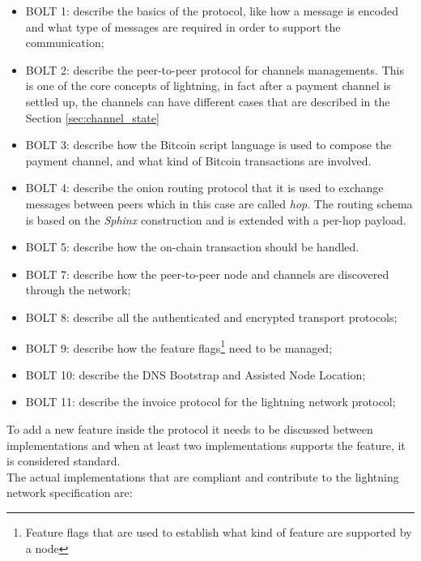 \begin{itemize}
  \item BOLT 1: describe the basics of the protocol, like how a message is encoded and what type of messages are required in order to support the communication;
  \item BOLT 2: describe the peer-to-peer protocol for channels managements. This is one of the core concepts of lightning, in fact after a payment channel
        is settled up, the channels can have different cases that are described in the Section \ref{sec:channel_state}
  \item BOLT 3: describe how the Bitcoin script language is used to compose the
        payment channel, and what kind of Bitcoin transactions are involved.
  \item BOLT 4: describe the onion routing protocol that it is used to exchange messages between peers which in this case are called \emph{hop}.
        The routing schema is based on the \emph{Sphinx}\cite{sphinx} construction and is extended with a per-hop payload.
  \item BOLT 5: describe how the on-chain transaction should be handled.
  \item BOLT 7: describe how the peer-to-peer node and channels are discovered through the network;
  \item BOLT 8: describe all the authenticated and encrypted transport protocols;
  \item BOLT 9: describe how the feature flags\footnote{Feature flags that are used to establish what kind of feature are supported by a node} need to be managed;
  \item BOLT 10: describe the DNS Bootstrap and Assisted Node Location;
  \item BOLT 11: describe the invoice protocol for the lightning network protocol;
\end{itemize}

To add a new feature inside the protocol it needs to be discussed between implementations and when at least two implementations supports the feature, it is considered standard.\\
The actual implementations that are compliant and contribute to the lightning network specification are:

